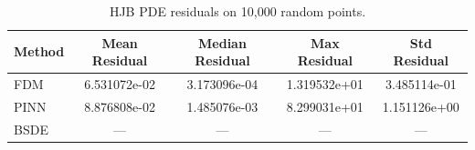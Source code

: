 \begin{table}[ht]
\centering
\caption{HJB PDE residuals on 10,000 random points.}
\label{tab:hjb_residual}
\begin{tabular}{lcccc}
\toprule
Method & Mean Residual & Median Residual & Max Residual & Std Residual \\
\midrule
FDM & 6.531072e-02 & 3.173096e-04 & 1.319532e+01 & 3.485114e-01 \\
PINN & 8.876808e-02 & 1.485076e-03 & 8.299031e+01 & 1.151126e+00 \\
BSDE & — & — & — & — \\
\bottomrule
\end{tabular}
\end{table}